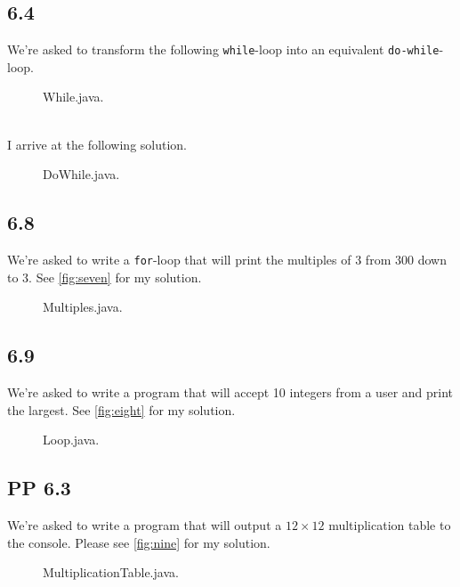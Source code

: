 \documentclass[leqno, 11pt]{article}
\begin{document}
\subsection*{6.4}
We're asked to transform the following \texttt{while}-loop into an equivalent \texttt{do-while}-loop.
\begin{figure}[h!]
  \centering
  
  \caption{While.java.}
  \label{fig:five}
\end{figure}\\
I arrive at the following solution.
\begin{figure}[h!]
  \centering
  
  \caption{DoWhile.java.}
  \label{fig:six}
\end{figure}
\subsection*{6.8}
We're asked to write a \texttt{for}-loop that will print the multiples of $3$ from $300$ down to $3$. See \autoref{fig:seven} for my solution.
\begin{figure}[h!]
  \centering
  
  \caption{Multiples.java.}
  \label{fig:seven}
\end{figure}
\subsection*{6.9}
We're asked to write a program that will accept 10 integers from a user and print the largest. See \autoref{fig:eight} for my solution.
\begin{figure}[h!]
  \centering
  
  \caption{Loop.java.}
  \label{fig:eight}
\end{figure}
\subsection*{PP 6.3}
We're asked to write a program that will output a $12\times 12$ multiplication table to the console. Please see \autoref{fig:nine} for my solution.
\begin{figure}[h!]
  \centering
  
  \caption{MultiplicationTable.java.}
  \label{fig:nine}
\end{figure}
\end{document}
